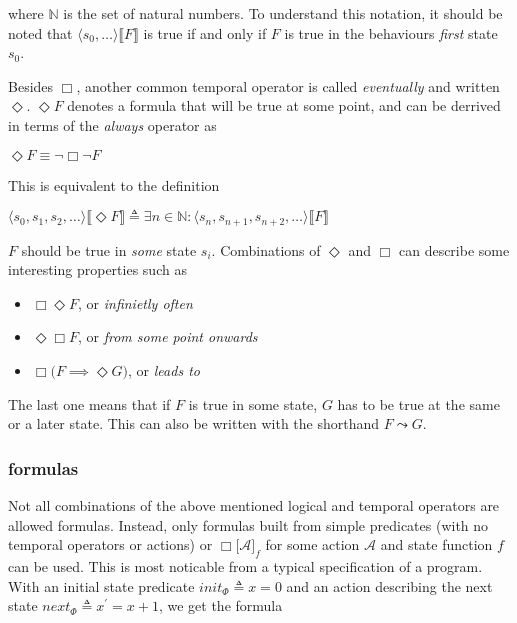 \documentclass[english, biblatex, digitaloutput]{kththesis}
\begin{document}
where $\mathbb{N}$ is the set of natural numbers. To understand this notation, it should be noted that $\langle s_0, \dotsc \rangle \llbracket F \rrbracket$ is true if and only if $F$ is true in the behaviours \textit{first} state $s_0$.

Besides $\Box$, another common temporal operator is called \textit{eventually} and written $\Diamond$. $\Diamond F$ denotes a formula that will be true at some point, and can be derrived in terms of the \textit{always} operator as

\begin{math}
	\Diamond F \equiv \neg \Box \neg F
\end{math}

This is equivalent to the definition

\begin{math}
	\langle s_0, s_1, s_2, \dotsc \rangle \llbracket \Diamond F \rrbracket \triangleq \exists n \in \mathbb{N} : \langle s_n, s_{n+1}, s_{n+2}, \dotsc \rangle \llbracket F \rrbracket
\end{math}

\ie $F$ should be true in \textit{some} state $s_i$. Combinations of $\Diamond$ and $\Box$ can describe some interesting properties such as

\begin{itemize}
	\item $\Box\Diamond F$, or \textit{infinietly often}
	\item $\Diamond\Box F$, or \textit{from some point onwards}
	\item $\Box \lparen F \implies \Diamond G \rparen$, or \textit{leads to}
\end{itemize}

The last one means that if $F$ is true in some state, $G$ has to be true at the same or a later state. This can also be written with the shorthand $F \leadsto G$.

\subsubsection{ formulas}

Not all combinations of the above mentioned logical and temporal operators are allowed  formulas. Instead, only formulas built from simple predicates (with no temporal operators or actions) or $\Box \lbrack \mathcal{A}  \rbrack_{f}$ for some action $\mathcal{A}$ and state function $f$ can be used. This is most noticable from a typical  specification of a program. With an initial state predicate $init_\Phi \triangleq x = 0$ and an action describing the next state $next_\Phi \triangleq x^\prime = x + 1$, we get the  formula
\end{document}
